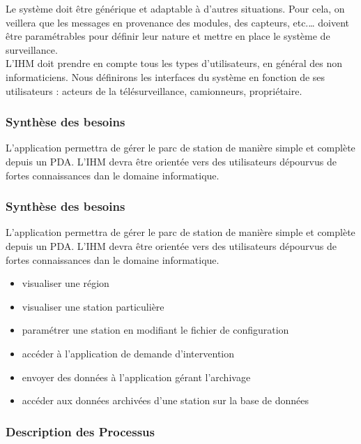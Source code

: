 Le système doit être générique et adaptable à d’autres situations. Pour cela, on veillera que les 
messages en provenance des modules, des capteurs, etc.… doivent être paramétrables pour définir 
leur nature et mettre en place le système de surveillance.\\

L'IHM doit prendre en compte tous les types d'utilisateurs, en général des non informaticiens. 
Nous définirons les interfaces du système en fonction de ses utilisateurs : 
acteurs de la télésurveillance, camionneurs, propriétaire.
 

\subsubsection{Synthèse des besoins}
L'application permettra de gérer le parc de station de manière simple et complète depuis un PDA. 
L'IHM devra être orientée vers des utilisateurs dépourvus de fortes connaissances dan le domaine informatique.\\

\subsubsection{Synthèse des besoins}
L'application permettra de gérer le parc de station de manière simple et complète depuis un PDA. L'IHM devra être orientée vers des utilisateurs dépourvus de fortes connaissances dan le domaine informatique.\\


\begin{itemize}
\item   visualiser une région \\
\item	visualiser une station particulière \\
\item	paramétrer une station en modifiant le fichier de configuration \\
\item	accéder à l'application de demande d'intervention \\
\item	envoyer des données à l'application gérant l'archivage\\ 
\item	accéder aux données archivées d'une station sur la base de données\\
\end{itemize}


\subsubsection{Description des Processus}

